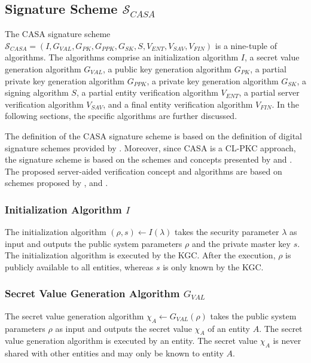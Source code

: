 \subsection{Signature Scheme $\mathcal{S}_{CASA}$}
The CASA signature scheme $\mathcal{S}_{CASA} = (I, G_{VAL}, G_{PK}, G_{PPK}, G_{SK}, S, V_{ENT}, V_{SAV}, V_{FIN})$ is a nine-tuple of algorithms.
The algorithms comprise an initialization algorithm $I$, a secret value generation algorithm $G_{VAL}$, a public key generation algorithm $G_{PK}$, a partial private key generation algorithm $G_{PPK}$, a private key generation algorithm $G_{SK}$, a signing algorithm $S$, a partial entity verification algorithm $V_{ENT}$, a partial server verification algorithm $V_{SAV}$, and a final entity verification algorithm $V_{FIN}$.
In the following sections, the specific algorithms are further discussed.

The definition of the CASA signature scheme is based on the definition of digital signature schemes provided by \citeauthor{Boneh2023} \cite{Boneh2023}.
Moreover, since CASA is a CL-PKC approach, the signature scheme is based on the schemes and concepts presented by \citeauthor{AlRiyami2003} \cite{AlRiyami2003} and \citeauthor{Ramadan2023} \cite{Ramadan2023}.
The proposed server-aided verification concept and algorithms are based on schemes proposed by \citeauthor{Ramadan2020} \cite{Ramadan2020}, \citeauthor{Girault2005} \cite{Girault2005} and \citeauthor{Wu2008} \cite{Wu2008}.

\subsubsection{Initialization Algorithm $I$}
The initialization algorithm $(\rho, s) \leftarrow I(\lambda)$ takes the security parameter $\lambda$ as input and outputs the public system parameters $\rho$ and the private master key $s$.
The initialization algorithm is executed by the KGC.
After the execution, $\rho$ is publicly available to all entities, whereas $s$ is only known by the KGC.

\subsubsection{Secret Value Generation Algorithm $G_{VAL}$}
The secret value generation algorithm $\chi_A \leftarrow G_{VAL}(\rho)$ takes the public system parameters $\rho$ as input and outputs the secret value $\chi_A$ of an entity $A$.
The secret value generation algorithm is executed by an entity.
The secret value $\chi_A$ is never shared with other entities and may only be known to entity $A$.

